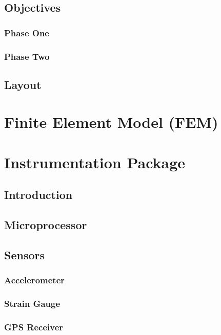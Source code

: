 \documentclass[12pt]{report}
\begin{document}
	\section{Objectives}
		\subsection{Phase One}
		\subsection{Phase Two}
	\section{Layout}
		
		
\chapter{Finite Element Model (FEM)}
\label{ch:FEM}
	

\chapter{Instrumentation Package}
\label{ch:Instrumentation}
	\section{Introduction}
		
	\section{Microprocessor}
		\label{sec:uProcessor}
		
	\section{Sensors}
		\subsection{Accelerometer}
			
		\subsection{Strain Gauge}
			
		\subsection{GPS Receiver}
			
\end{document}
